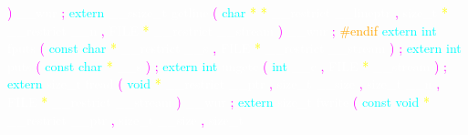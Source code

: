 \textcolor{magenta}{)} 
\textcolor{white}{\_\_wur} 
\textcolor{magenta}{;} 
\textcolor{cyan}{extern} 
\textcolor{white}{\_\_ssize\_t} 
\textcolor{white}{getline} 
\textcolor{magenta}{(} 
\textcolor{cyan}{char} 
\textcolor{yellow}{*} 
\textcolor{yellow}{*} 
\textcolor{white}{\_\_restrict} 
\textcolor{white}{\_\_lineptr} 
\textcolor{magenta}{,} 
\textcolor{white}{size\_t} 
\textcolor{yellow}{*} 
\textcolor{white}{\_\_restrict} 
\textcolor{white}{\_\_n} 
\textcolor{magenta}{,} 
\textcolor{white}{FILE} 
\textcolor{yellow}{*} 
\textcolor{white}{\_\_restrict} 
\textcolor{white}{\_\_stream} 
\textcolor{magenta}{)} 
\textcolor{white}{\_\_wur} 
\textcolor{magenta}{;} 
\textcolor{orange}{\#endif} 
\textcolor{cyan}{extern} 
\textcolor{cyan}{int} 
\textcolor{white}{fputs} 
\textcolor{magenta}{(} 
\textcolor{cyan}{const} 
\textcolor{cyan}{char} 
\textcolor{yellow}{*} 
\textcolor{white}{\_\_restrict} 
\textcolor{white}{\_\_s} 
\textcolor{magenta}{,} 
\textcolor{white}{FILE} 
\textcolor{yellow}{*} 
\textcolor{white}{\_\_restrict} 
\textcolor{white}{\_\_stream} 
\textcolor{magenta}{)} 
\textcolor{magenta}{;} 
\textcolor{cyan}{extern} 
\textcolor{cyan}{int} 
\textcolor{white}{puts} 
\textcolor{magenta}{(} 
\textcolor{cyan}{const} 
\textcolor{cyan}{char} 
\textcolor{yellow}{*} 
\textcolor{white}{\_\_s} 
\textcolor{magenta}{)} 
\textcolor{magenta}{;} 
\textcolor{cyan}{extern} 
\textcolor{cyan}{int} 
\textcolor{white}{ungetc} 
\textcolor{magenta}{(} 
\textcolor{cyan}{int} 
\textcolor{white}{\_\_c} 
\textcolor{magenta}{,} 
\textcolor{white}{FILE} 
\textcolor{yellow}{*} 
\textcolor{white}{\_\_stream} 
\textcolor{magenta}{)} 
\textcolor{magenta}{;} 
\textcolor{cyan}{extern} 
\textcolor{white}{size\_t} 
\textcolor{white}{fread} 
\textcolor{magenta}{(} 
\textcolor{cyan}{void} 
\textcolor{yellow}{*} 
\textcolor{white}{\_\_restrict} 
\textcolor{white}{\_\_ptr} 
\textcolor{magenta}{,} 
\textcolor{white}{size\_t} 
\textcolor{white}{\_\_size} 
\textcolor{magenta}{,} 
\textcolor{white}{size\_t} 
\textcolor{white}{\_\_n} 
\textcolor{magenta}{,} 
\textcolor{white}{FILE} 
\textcolor{yellow}{*} 
\textcolor{white}{\_\_restrict} 
\textcolor{white}{\_\_stream} 
\textcolor{magenta}{)} 
\textcolor{white}{\_\_wur} 
\textcolor{magenta}{;} 
\textcolor{cyan}{extern} 
\textcolor{white}{size\_t} 
\textcolor{white}{fwrite} 
\textcolor{magenta}{(} 
\textcolor{cyan}{const} 
\textcolor{cyan}{void} 
\textcolor{yellow}{*} 
\textcolor{white}{\_\_restrict} 
\textcolor{white}{\_\_ptr} 
\textcolor{magenta}{,} 
\textcolor{white}{size\_t} 
\textcolor{white}{\_\_size} 
\textcolor{magenta}{,} 
\textcolor{white}{size\_t} 
